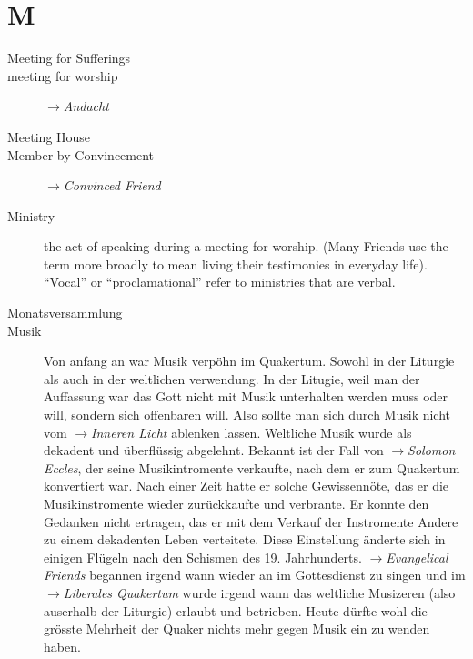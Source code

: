 \section*{M}

\articlesize

\begin{description}

 \item[Meeting for Sufferings]
 
 \item[meeting for worship]  $\to$\textit{Andacht}

 \item[Meeting House]

 \item[Member by Convincement] $\to$\textit{Convinced Friend}
 
 \item[Ministry]
    the act of speaking during a meeting for worship. (Many Friends use the term more broadly to mean living their testimonies in everyday life). "`Vocal"' or "`proclamational"' refer to ministries that are verbal.
 
 \item[Monatsversammlung]
 
 \item[Musik] Von anfang an war Musik verpöhn im Quakertum. Sowohl in der Liturgie
 als auch in der weltlichen verwendung. In der Litugie, weil man der Auffassung war
 das Gott nicht mit Musik unterhalten werden muss oder will, sondern sich offenbaren
 will. Also sollte man sich durch Musik nicht vom $\to$\textit{Inneren Licht}
 ablenken lassen. Weltliche Musik wurde als dekadent und überflüssig abgelehnt.
 Bekannt ist der Fall von $\to$\textit{Solomon Eccles}, der seine Musikintromente
 verkaufte, nach dem er zum Quakertum konvertiert war. Nach einer Zeit hatte er
 solche Gewissennöte, das er die Musikinstromente wieder zurückkaufte und
 verbrante. Er konnte den Gedanken nicht ertragen, das er mit dem Verkauf der
 Instromente Andere zu einem dekadenten Leben verteitete. Diese Einstellung
 änderte sich in einigen Flügeln nach den Schismen des 19. Jahrhunderts.
 $\to$\textit{Evangelical Friends} begannen irgend wann wieder an im
 Gottesdienst zu singen und im $\to$\textit{Liberales Quakertum} wurde irgend
 wann das weltliche Musizeren (also auserhalb der Liturgie) erlaubt und
 betrieben. Heute dürfte wohl die grösste Mehrheit der Quaker nichts mehr
 gegen Musik ein zu wenden haben.

 \end{description}

\normalsize
